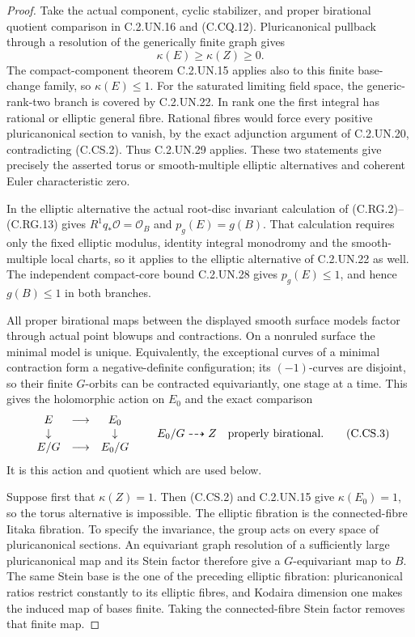 \begin{proof}
Take the actual component, cyclic stabilizer, and
proper birational quotient comparison in C.2.UN.16
and (C.CQ.12). Pluricanonical pullback through a
resolution of the generically finite graph gives
\[
             \kappa(E)\ge\kappa(Z)\ge0.
                                                               \tag{C.CS.2}
\]
The compact-component theorem C.2.UN.15 applies
also to this finite base-change family, so
$\kappa(E)\le1$. For the saturated limiting field
space, the generic-rank-two branch is covered
by C.2.UN.22. In rank one the first integral
has rational or elliptic general fibre. Rational
fibres would force every positive pluricanonical
section to vanish, by the exact adjunction
argument of C.2.UN.20, contradicting (C.CS.2).
Thus C.2.UN.29 applies. These two statements
give precisely the asserted torus or smooth-multiple
elliptic alternatives and coherent Euler characteristic
zero.

In the elliptic alternative the actual root-disc
invariant calculation of (C.RG.2)--(C.RG.13) gives
$R^1q_*\mathcal O=\mathcal O_B$ and
$p_g(E)=g(B)$. That calculation requires only
the fixed elliptic modulus, identity integral
monodromy and the smooth-multiple local charts,
so it applies to the elliptic alternative of
C.2.UN.22 as well. The independent compact-core
bound C.2.UN.28 gives $p_g(E)\le1$, and hence
$g(B)\le1$ in both branches.

All proper birational maps between the displayed
smooth surface models factor through actual
point blowups and contractions. On a nonruled
surface the minimal model is unique. Equivalently,
the exceptional curves of a minimal contraction
form a negative-definite configuration; its
$(-1)$-curves are disjoint, so their finite
$G$-orbits can be contracted equivariantly,
one stage at a time. This gives the holomorphic
action on $E_0$ and the exact comparison
\[
 \begin{array}{ccc}
 E&\longrightarrow&E_0\\
 \downarrow&&\downarrow\\
 E/G&\longrightarrow&E_0/G
 \end{array}
 \qquad E_0/G\dashrightarrow Z
       \quad\hbox{properly birational}.
                                                               \tag{C.CS.3}
\]
It is this action and quotient which are used
below.

Suppose first that $\kappa(Z)=1$. Then
(C.CS.2) and C.2.UN.15 give $\kappa(E_0)=1$,
so the torus alternative is impossible. The
elliptic fibration is the connected-fibre
Iitaka fibration. To specify the invariance,
the group acts on every space of pluricanonical
sections. An equivariant graph resolution of
a sufficiently large pluricanonical map and
its Stein factor therefore give a $G$-equivariant
map to $B$. The same Stein base is the one
of the preceding elliptic fibration: pluricanonical
ratios restrict constantly to its elliptic
fibres, and Kodaira dimension one makes the
induced map of bases finite. Taking the
connected-fibre Stein factor removes that
finite map.


\end{proof}
